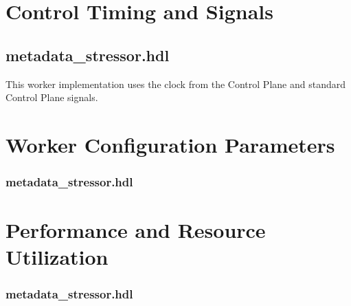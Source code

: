 \documentclass{article}
\def\comp{metadata\_stressor}
\edef\ecomp{metadata_stressor}
\begin{document}
\section*{Control Timing and Signals}
\subsection*{\comp.hdl}
\begin{flushleft}
This worker implementation uses the clock from the Control Plane and standard Control Plane signals.
\end{flushleft}

\begin{landscape}
\section*{Worker Configuration Parameters}
\subsubsection*{\comp.hdl}

\section*{Performance and Resource Utilization}
\subsubsection*{\comp.hdl}

\end{landscape}
\end{document}
